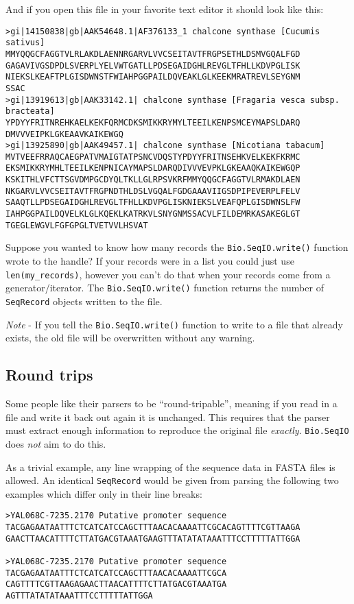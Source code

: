 \noindent And if you open this file in your favorite text editor it should look like this:

\begin{verbatim}
>gi|14150838|gb|AAK54648.1|AF376133_1 chalcone synthase [Cucumis sativus]
MMYQQGCFAGGTVLRLAKDLAENNRGARVLVVCSEITAVTFRGPSETHLDSMVGQALFGD
GAGAVIVGSDPDLSVERPLYELVWTGATLLPDSEGAIDGHLREVGLTFHLLKDVPGLISK
NIEKSLKEAFTPLGISDWNSTFWIAHPGGPAILDQVEAKLGLKEEKMRATREVLSEYGNM
SSAC
>gi|13919613|gb|AAK33142.1| chalcone synthase [Fragaria vesca subsp. bracteata]
YPDYYFRITNREHKAELKEKFQRMCDKSMIKKRYMYLTEEILKENPSMCEYMAPSLDARQ
DMVVVEIPKLGKEAAVKAIKEWGQ
>gi|13925890|gb|AAK49457.1| chalcone synthase [Nicotiana tabacum]
MVTVEEFRRAQCAEGPATVMAIGTATPSNCVDQSTYPDYYFRITNSEHKVELKEKFKRMC
EKSMIKKRYMHLTEEILKENPNICAYMAPSLDARQDIVVVEVPKLGKEAAQKAIKEWGQP
KSKITHLVFCTTSGVDMPGCDYQLTKLLGLRPSVKRFMMYQQGCFAGGTVLRMAKDLAEN
NKGARVLVVCSEITAVTFRGPNDTHLDSLVGQALFGDGAAAVIIGSDPIPEVERPLFELV
SAAQTLLPDSEGAIDGHLREVGLTFHLLKDVPGLISKNIEKSLVEAFQPLGISDWNSLFW
IAHPGGPAILDQVELKLGLKQEKLKATRKVLSNYGNMSSACVLFILDEMRKASAKEGLGT
TGEGLEWGVLFGFGPGLTVETVVLHSVAT
\end{verbatim}

Suppose you wanted to know how many records the \verb|Bio.SeqIO.write()| function wrote to the handle?
If your records were in a list you could just use \verb|len(my_records)|, however you can't do that when your records come from a generator/iterator.  The \verb|Bio.SeqIO.write()| function returns the number of \verb|SeqRecord| objects written to the file.

\emph{Note} - If you tell the \verb|Bio.SeqIO.write()| function to write to a file that already exists, the old file will be overwritten without any warning.

\subsection{Round trips}

Some people like their parsers to be ``round-tripable'', meaning if you read in
a file and write it back out again it is unchanged. This requires that the parser
must extract enough information to reproduce the original file \emph{exactly}.
\verb|Bio.SeqIO| does \emph{not} aim to do this.

As a trivial example, any line wrapping of the sequence data in FASTA files is
allowed. An identical \verb|SeqRecord| would be given from parsing the following
two examples which differ only in their line breaks:

\begin{verbatim}
>YAL068C-7235.2170 Putative promoter sequence
TACGAGAATAATTTCTCATCATCCAGCTTTAACACAAAATTCGCACAGTTTTCGTTAAGA
GAACTTAACATTTTCTTATGACGTAAATGAAGTTTATATATAAATTTCCTTTTTATTGGA

>YAL068C-7235.2170 Putative promoter sequence
TACGAGAATAATTTCTCATCATCCAGCTTTAACACAAAATTCGCA
CAGTTTTCGTTAAGAGAACTTAACATTTTCTTATGACGTAAATGA
AGTTTATATATAAATTTCCTTTTTATTGGA
\end{verbatim}

